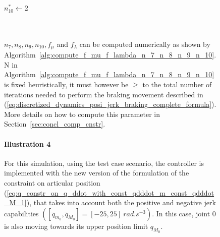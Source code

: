 \begin{figure}[!htbp]
\begin{minipage}{\textwidth}
\begin{algorithm}[H]
\begin{algorithmic}[1]
            {$n_{10}^{*} \gets 2$}%
        \EndIf   
        \EndIf            
\EndFor
{}
\myState {}\;
\end{algorithmic}
\end{algorithm}
\end{minipage} \\
\\
$n_{7}, n_{8}, n_{9}, n_{10}, f_{\mu}$ and $f_{\lambda}$ can be computed numerically as shown by Algorithm~\ref{alg:compute_f_mu_f_lambda_n_7_n_8_n_9_n_10}. N in Algorithm~\ref{alg:compute_f_mu_f_lambda_n_7_n_8_n_9_n_10} is fixed heuristically, it must however be $\geq$ to the total number of iterations needed to perform the braking movement described in (\ref{eq:discretized_dynamics_posi_jerk_braking_complete_formula}). More details on how to compute this parameter in Section~\ref{sec:concl_comp_cnstr}.
\paragraph{Illustration 4}
For this simulation, using the test case scenario, the controller is implemented with the new version of the formulation of the constraint on articular position (\ref{eq:q_constr_on_q_ddot_with_const_qdddot_m_const_qdddot_M_1}), that takes  into account both the positive and negative jerk capabilities $([\dddot{q}_{m_{0}}, \dddot{q}_{M_{0}}] = [-25, 25]~rad.s^{-3})$. In this case, joint $0$ is also moving towards its upper position limit $q_{M_{0}}$. 


\end{figure}
